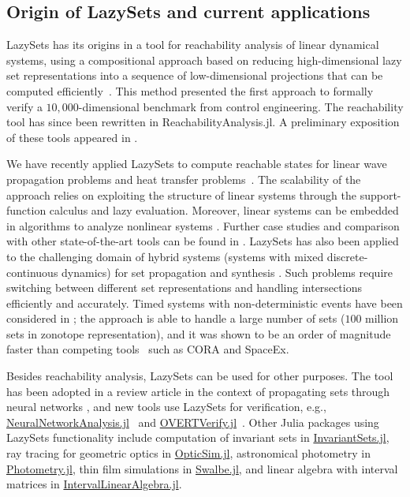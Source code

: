 \subsection{Origin of LazySets and current applications}

LazySets has its origins in a tool for reachability analysis of linear dynamical systems, using a compositional approach based on reducing high-dimensional lazy set representations into a sequence of low-dimensional projections that can be computed efficiently~\cite{BogomolovFFVPS18}.
%
This method presented the first approach to formally verify a $10{,}000$-dimensional benchmark from control engineering.
%
The reachability tool has since been rewritten in ReachabilityAnalysis.jl.
%
A preliminary exposition of these tools appeared in \cite{BogomolovFFPS19}.

\smallskip

We have recently applied LazySets to compute reachable states for linear wave propagation problems and heat transfer problems~\cite{forets2021combining}.
%
The scalability of the approach relies on exploiting the structure of linear systems through the support-function calculus and lazy evaluation.
%
Moreover, linear systems can be embedded in algorithms to analyze nonlinear systems \cite{forets2021reachability}.
%
Further case studies and comparison with other state-of-the-art tools can be found in \cite{ARCHCOMP20LINEAR, ARCHCOMP20NONLINEAR}.
%
LazySets has also been applied to the challenging domain of hybrid systems (systems with mixed discrete-continuous dynamics) for set propagation \cite{bogomolov2020reachability} and synthesis \cite{soto2021synthesis}.
%
Such problems require switching between different set representations and handling intersections efficiently and accurately.
%
Timed systems with non-deterministic events have been considered in \cite{forets2020efficient}; the approach is able to handle a large number of sets ($100$ million sets in zonotope representation), and it was shown to be an order of magnitude faster than competing tools~\cite{ARCHCOMP20LINEAR} such as CORA and SpaceEx.

\smallskip

Besides reachability analysis, LazySets can be used for other purposes. The tool has been adopted in a review article in the context of propagating sets through neural networks \cite{LiuALSBK21}, and new tools use LazySets for verification, e.g.,
\href{https://github.com/JuliaReach/NeuralNetworkAnalysis.jl}{NeuralNetworkAnalysis.jl}~\cite{schilling2021verification} and \href{https://github.com/sisl/OVERTVerify.jl}{OVERTVerify.jl}~\cite{sidrane2021overt}.
%
Other Julia packages using LazySets functionality include computation of invariant sets in \href{https://github.com/ueliwechsler/InvariantSets.jl}{InvariantSets.jl}, ray tracing for geometric optics in \href{https://github.com/microsoft/OpticSim.jl}{OpticSim.jl}, astronomical photometry in \href{https://github.com/JuliaAstro/Photometry.jl}{Photometry.jl}, thin film simulations in \href{https://github.com/Zitzeronion/Swalbe.jl}{Swalbe.jl}, and linear algebra with interval matrices in \href{https://github.com/JuliaIntervals/IntervalLinearAlgebra.jl}{IntervalLinearAlgebra.jl}.


